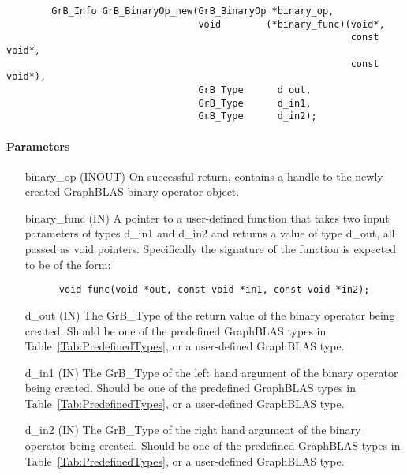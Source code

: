 \begin{verbatim}
        GrB_Info GrB_BinaryOp_new(GrB_BinaryOp *binary_op,
                                  void        (*binary_func)(void*,
                                                             const void*,
                                                             const void*),
                                  GrB_Type      d_out,
                                  GrB_Type      d_in1,
                                  GrB_Type      d_in2);
\end{verbatim}

\paragraph{Parameters}

\begin{itemize}[leftmargin=1.1in]
    \item[{\sf binary\_op}] ({\sf INOUT}) On successful return, contains a 
          handle to the newly created GraphBLAS binary operator object.
    \item[{\sf binary\_func}] ({\sf IN}) A pointer to a user-defined function that 
          takes two input parameters of types {\sf d\_in1} and {\sf d\_in2} and returns a value of
		type {\sf d\_out}, all passed as {\sf void} pointers.
          Specifically the signature of the function is expected to 
          be of the form:
      \begin{verbatim}
      void func(void *out, const void *in1, const void *in2);
      \end{verbatim}
    \item[{\sf d\_out}]  ({\sf IN}) The {\sf GrB\_Type} of the return
          value of the binary operator being created. Should be one of the
          predefined GraphBLAS types in Table~\ref{Tab:PredefinedTypes}, or a 
          user-defined GraphBLAS type.
    \item[{\sf d\_in1}]  ({\sf IN}) The {\sf GrB\_Type} of the left hand 
          argument of the binary operator being created. Should be one of the
          predefined GraphBLAS types in Table~\ref{Tab:PredefinedTypes}, or a
          user-defined GraphBLAS type.
    \item[{\sf d\_in2}]  ({\sf IN}) The {\sf GrB\_Type} of the right hand 
          argument of the binary operator being created. Should be one of the
          predefined GraphBLAS types in Table~\ref{Tab:PredefinedTypes}, or a 
          user-defined GraphBLAS type.
\end{itemize}

